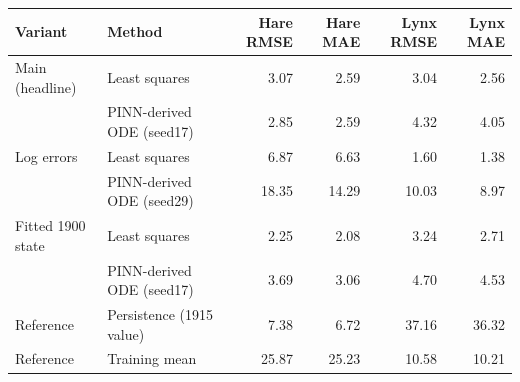 \begin{tabular}{llrrrr}
\hline
Variant & Method & Hare RMSE & Hare MAE & Lynx RMSE & Lynx MAE \\
\hline
Main (headline) & Least squares & 3.07 & 2.59 & 3.04 & 2.56 \\
 & PINN-derived ODE (seed17) & 2.85 & 2.59 & 4.32 & 4.05 \\
Log errors & Least squares & 6.87 & 6.63 & 1.60 & 1.38 \\
 & PINN-derived ODE (seed29) & 18.35 & 14.29 & 10.03 & 8.97 \\
Fitted 1900 state & Least squares & 2.25 & 2.08 & 3.24 & 2.71 \\
 & PINN-derived ODE (seed17) & 3.69 & 3.06 & 4.70 & 4.53 \\
\hline
Reference & Persistence (1915 value) & 7.38 & 6.72 & 37.16 & 36.32 \\
Reference & Training mean & 25.87 & 25.23 & 10.58 & 10.21 \\
\hline
\end{tabular}
